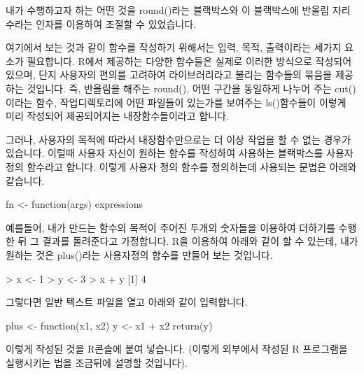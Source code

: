 내가 수행하고자 하는 어떤 것을 round()라는 블랙박스와 이 블랙박스에 반올림 자리수라는 인자를 이용하여 조절할 수 있었습니다. 

여기에서 보는 것과 같이 함수를 작성하기 위해서는 입력, 목적, 출력이라는 세가지 요소가 필요합니다. 
R에서 제공하는 다양한 함수들은 실제로 이러한 방식으로 작성되어 있으며, 단지 사용자의 편의를 고려하여 라이브러리라고 불리는 함수들의 묶음을 제공하는 것입니다. 
즉, 반올림을 해주는 round(), 어떤 구간을 동일하게 나누어 주는 cut()이라는 함수, 작업디렉토리에 어떤 파일들이 있는가를 보여주는 ls()함수들이 이렇게 미리 작성되어 제공되어지는 내장함수들이라고 합니다.

그러나, 사용자의 목적에 따라서 내장함수만으로는 더 이상 작업을 할 수 없는 경우가 있습니다.
이럴때 사용자 자신이 원하는 함수를 작성하여 사용하는 블랙박스를 사용자정의 함수라고 합니다.
이렇게 사용자 정의 함수를 정의하는데 사용되는 문법은 아래와 같습니다. 

\begin{Schunk}
\begin{Soutput}
fn <- function(args){
	expressions
}
\end{Soutput}
\end{Schunk}

예를들어, 내가 만드는 함수의 목적이 주어진 두개의 숫자들을 이용하여 더하기를 수행한 뒤 그 결과를 돌려준다고 가정합니다.
R을 이용하여 아래와 같이 할 수 있는데, 내가 원하는 것은 plus()라는 사용자정의 함수를 만들어 보는 것입니다. 

\begin{Schunk}
\begin{Soutput}
> x <- 1
> y <- 3
> x + y
[1] 4
\end{Soutput}
\end{Schunk}

그렇다면 일반 텍스트 파일을 열고 아래와 같이 입력합니다. 

\begin{Schunk}
\begin{Soutput}
plus <- function(x1, x2){
	y <- x1 + x2
	return(y)
}
\end{Soutput}
\end{Schunk}

이렇게 작성된 것을 R콘솔에 붙여 넣습니다.  
(이렇게 외부에서 작성된 R 프로그램을 실행시키는 법을 조금뒤에 설명할 것입니다).



